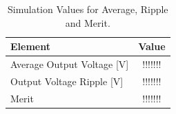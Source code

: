 \begin{table}[h]
    \centering
    \begin{tabular}{|l|c|}
    \hline
    {\bf Element } & {\bf Value } \\
    \hline \hline
    Average Output Voltage [V] & !!!!!!! \\   %
    \hline
    Output Voltage Ripple [V] & !!!!!!! \\
    \hline
    Merit & !!!!!!! \\
    \hline
    \end{tabular}
    \caption{Simulation Values for Average, Ripple and Merit.}
    \label{tab:tsim1}
\end{table}







